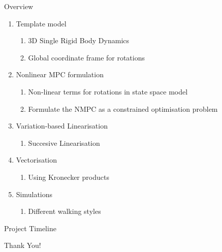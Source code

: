 \documentclass{beamer}
\begin{document}
\begin{frame}{Overview}
	
	
	\setlength{\itemsep}{1em}
	\setlength{\parskip}{2pt}
	\begin{enumerate}\small
		\item Template model
		      \begin{enumerate}\scriptsize
		      	\item 3D Single Rigid Body Dynamics
		      	\item Global coordinate frame for rotations
		      \end{enumerate}
		\item Nonlinear MPC formulation
		      \begin{enumerate}\scriptsize
		      	\item Non-linear terms for rotations in state space model
		      	\item Formulate the NMPC as a constrained optimisation problem
		      \end{enumerate}
		\item Variation-based Linearisation
		      \begin{enumerate}\scriptsize
		      	\item Succesive Linearisation
		      \end{enumerate}
		\item Vectorisation
		      \begin{enumerate}\scriptsize
		      	\item Using Kronecker products
		      \end{enumerate}
		\item Simulations
		      \begin{enumerate}\scriptsize
		      	\item Different walking styles
		      \end{enumerate}
	\end{enumerate}
	
\end{frame}


\begin{frame}{Project Timeline}
	
\end{frame}


\begin{frame}
	\LARGE{Thank You!}
\end{frame}
\end{document}
